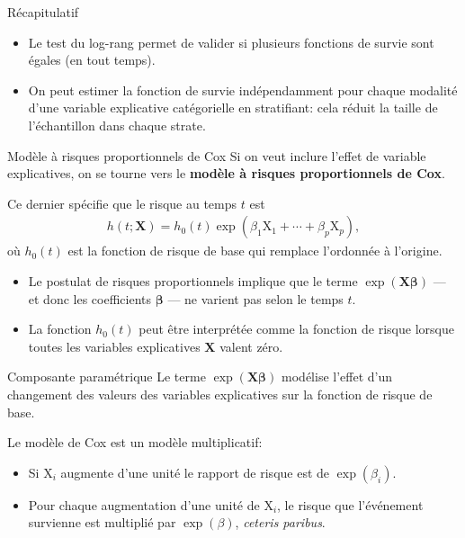 \documentclass[
  ignorenonframetext,
]{beamer}
\providecommand{\tightlist}{%
  \setlength{\itemsep}{0pt}\setlength{\parskip}{0pt}}\usepackage{longtable,booktabs,array}
\begin{document}
\begin{frame}{Récapitulatif}
\protect\hypertarget{ruxe9capitulatif-4}{}
\begin{itemize}
\tightlist
\item
  Le test du log-rang permet de valider si plusieurs fonctions de survie
  sont égales (en tout temps).
\item
  On peut estimer la fonction de survie indépendamment pour chaque
  modalité d'une variable explicative catégorielle en stratifiant: cela
  réduit la taille de l'échantillon dans chaque strate.
\end{itemize}
\end{frame}

\begin{frame}{Modèle à risques proportionnels de Cox}
\protect\hypertarget{moduxe8le-uxe0-risques-proportionnels-de-cox}{}
Si on veut inclure l'effet de variable explicatives, on se tourne vers
le \textbf{modèle à risques proportionnels de Cox}.

Ce dernier spécifie que le risque au temps \(t\) est \begin{align*}
h(t; \mathbf{X}) = h_0(t)\exp(\beta_1\mathrm{X}_1 + \cdots + \beta_p \mathrm{X}_p),
\end{align*} où \(h_0(t)\) est la fonction de risque de base qui
remplace l'ordonnée à l'origine.

\begin{itemize}
\tightlist
\item
  Le postulat de risques proportionnels implique que le terme
  \(\exp(\mathbf{X}\boldsymbol{\beta})\) --- et donc les coefficients
  \(\boldsymbol{\beta}\) --- ne varient pas selon le temps \(t\).
\item
  La fonction \(h_0(t)\) peut être interprétée comme la fonction de
  risque lorsque toutes les variables explicatives \(\mathbf{X}\) valent
  zéro.
\end{itemize}
\end{frame}

\begin{frame}{Composante paramétrique}
\protect\hypertarget{composante-paramuxe9trique}{}
Le terme \(\exp(\mathbf{X}\boldsymbol{\beta})\) modélise l'effet d'un
changement des valeurs des variables explicatives sur la fonction de
risque de base.

Le modèle de Cox est un modèle multiplicatif:

\begin{itemize}
\tightlist
\item
  Si \(\mathrm{X}_i\) augmente d'une unité le rapport de risque est de
  \(\exp(\beta_i)\).
\item
  Pour chaque augmentation d'une unité de \(\mathrm{X}_i\), le risque
  que l'événement survienne est multiplié par \(\exp(\beta)\),
  \emph{ceteris paribus}.
\end{itemize}
\end{frame}
\end{document}
